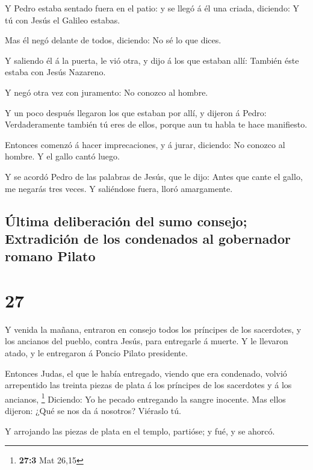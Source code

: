  Y Pedro estaba sentado fuera en el patio: y se llegó á él
una criada, diciendo: Y tú con Jesús el Galileo estabas.

 Mas él negó delante de todos, diciendo: No sé lo que
dices.

 Y saliendo él á la puerta, le vió otra, y dijo á los que
estaban allí: También éste estaba con Jesús Nazareno.

 Y negó otra vez con juramento: No conozco al hombre.

 Y un poco después llegaron los que estaban por allí, y
dijeron á Pedro: Verdaderamente también tú eres de ellos, porque aun tu
habla te hace manifiesto.

 Entonces comenzó á hacer imprecaciones, y á jurar,
diciendo: No conozco al hombre. Y el gallo cantó luego.

 Y se acordó Pedro de las palabras de Jesús, que le dijo:
Antes que cante el gallo, me negarás tres veces. Y saliéndose fuera,
lloró amargamente.

\hypertarget{uxfaltima-deliberaciuxf3n-del-sumo-consejo-extradiciuxf3n-de-los-condenados-al-gobernador-romano-pilato}{%
\subsection{Última deliberación del sumo consejo; Extradición de los
condenados al gobernador romano
Pilato}\label{uxfaltima-deliberaciuxf3n-del-sumo-consejo-extradiciuxf3n-de-los-condenados-al-gobernador-romano-pilato}}

\hypertarget{section-26}{%
\section{27}\label{section-26}}

 Y venida la mañana, entraron en consejo todos los príncipes
de los sacerdotes, y los ancianos del pueblo, contra Jesús, para
entregarle á muerte.  Y le llevaron atado, y le entregaron á
Poncio Pilato presidente.

 Entonces Judas, el que le había entregado, viendo que era
condenado, volvió arrepentido las treinta piezas de plata á los
príncipes de los sacerdotes y á los ancianos, \footnote{\textbf{27:3}
  Mat 26,15}  Diciendo: Yo he pecado entregando la sangre
inocente. Mas ellos dijeron: ¿Qué se nos da á nosotros? Viéraslo tú.

 Y arrojando las piezas de plata en el templo, partióse; y
fué, y se ahorcó.


